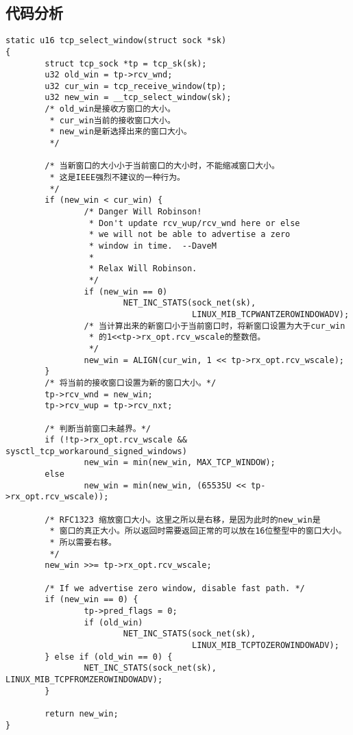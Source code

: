 \subsection{代码分析}
\begin{verbatim}
static u16 tcp_select_window(struct sock *sk)
{
        struct tcp_sock *tp = tcp_sk(sk);
        u32 old_win = tp->rcv_wnd;
        u32 cur_win = tcp_receive_window(tp);
        u32 new_win = __tcp_select_window(sk);
        /* old_win是接收方窗口的大小。
         * cur_win当前的接收窗口大小。
         * new_win是新选择出来的窗口大小。
         */

        /* 当新窗口的大小小于当前窗口的大小时，不能缩减窗口大小。
         * 这是IEEE强烈不建议的一种行为。
         */
        if (new_win < cur_win) {
                /* Danger Will Robinson!
                 * Don't update rcv_wup/rcv_wnd here or else
                 * we will not be able to advertise a zero
                 * window in time.  --DaveM
                 *
                 * Relax Will Robinson.
                 */
                if (new_win == 0)
                        NET_INC_STATS(sock_net(sk),
                                      LINUX_MIB_TCPWANTZEROWINDOWADV);
                /* 当计算出来的新窗口小于当前窗口时，将新窗口设置为大于cur_win
                 * 的1<<tp->rx_opt.rcv_wscale的整数倍。
                 */
                new_win = ALIGN(cur_win, 1 << tp->rx_opt.rcv_wscale);
        }
        /* 将当前的接收窗口设置为新的窗口大小。*/
        tp->rcv_wnd = new_win;
        tp->rcv_wup = tp->rcv_nxt;

        /* 判断当前窗口未越界。*/
        if (!tp->rx_opt.rcv_wscale && sysctl_tcp_workaround_signed_windows)
                new_win = min(new_win, MAX_TCP_WINDOW);
        else
                new_win = min(new_win, (65535U << tp->rx_opt.rcv_wscale));

        /* RFC1323 缩放窗口大小。这里之所以是右移，是因为此时的new_win是
         * 窗口的真正大小。所以返回时需要返回正常的可以放在16位整型中的窗口大小。
         * 所以需要右移。
         */
        new_win >>= tp->rx_opt.rcv_wscale;

        /* If we advertise zero window, disable fast path. */
        if (new_win == 0) {
                tp->pred_flags = 0;
                if (old_win)
                        NET_INC_STATS(sock_net(sk),
                                      LINUX_MIB_TCPTOZEROWINDOWADV);
        } else if (old_win == 0) {
                NET_INC_STATS(sock_net(sk), LINUX_MIB_TCPFROMZEROWINDOWADV);
        }

        return new_win;
}
\end{verbatim}

